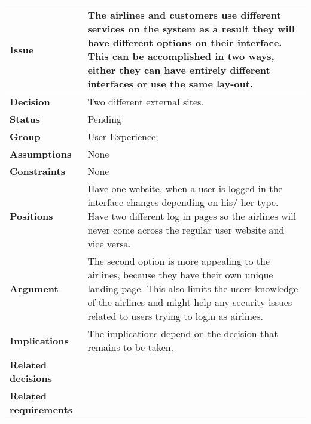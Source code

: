 
\begin{tabular}{ l  p{10cm}}
\hline
\bf Issue & The airlines and customers use different services on the system as a result they will have different options on their interface. This can be accomplished in two ways, either they can have entirely different interfaces or use the same lay-out. \\
\hline
\bf Decision & Two different external sites.\\
\hline
\bf Status & Pending\\
\hline
\bf Group & User Experience;  \\
\hline
\bf Assumptions & None \\
\hline
\bf Constraints & None\\
\hline
\bf Positions &  Have one website, when a user is logged in the interface changes depending on his/ her type. \newline\newline
Have two different log in pages so the airlines will never come across the regular user website and vice versa.
\\
\hline
\bf Argument & The second option is more appealing to the airlines, because they have their own unique landing page. This also limits the users knowledge of the airlines and might help any security issues related to users trying to login as airlines. \\
\hline
\bf Implications & The implications depend on the decision that remains to be taken. \\
\hline
\bf Related decisions & \\
\hline
\bf Related requirements  & \\
\hline
\end{tabular}

